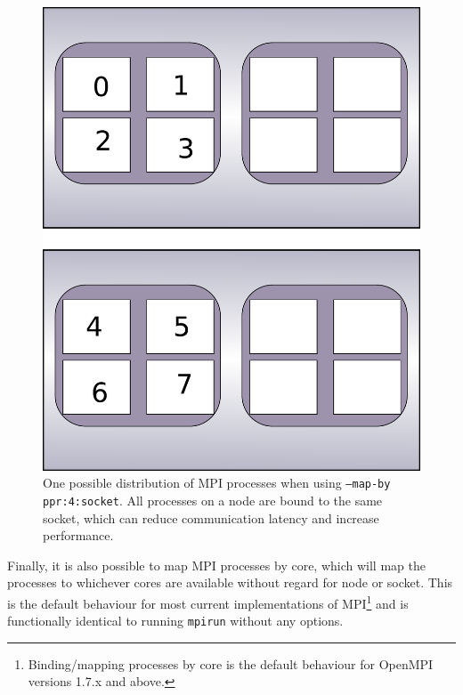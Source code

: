\documentclass{report}
\begin{document}
\begin{figure}
\label{fig:MPI_map-by_socket}
\centering
\includegraphics[height = 0.5\textheight]{MPI_map-by_socket.pdf}
\caption{One possible distribution of MPI processes when using \texttt{--map-by ppr:4:socket}. All
processes on a node are bound to the same socket, which can reduce communication latency and increase
performance.}
\end{figure}

Finally, it is also possible to map MPI processes by core, which will map the processes to whichever
cores are available without regard for node or socket. This is the default behaviour for most
current implementations of MPI\footnote{Binding/mapping processes by core is the default behaviour for
OpenMPI versions 1.7.x and above.} and is functionally identical to running \texttt{mpirun} without any
options.
\end{document}
